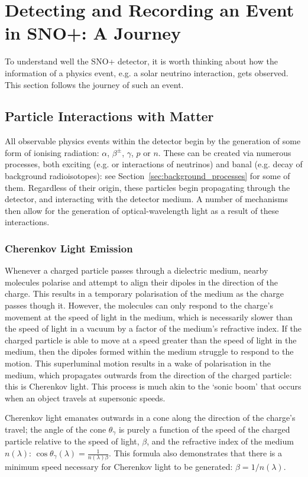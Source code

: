 \section{Detecting and Recording an Event in SNO+: A Journey}
To understand well the SNO+ detector, it is worth thinking about how the information of a physics event, e.g. a solar neutrino interaction, gets observed. This section follows the journey of such an event.
\subsection{Particle Interactions with Matter}\label{sec:interactions_w_matter}
All observable physics events within the detector begin by the generation of some form of ionising radiation: $\alpha$, $\beta^{\pm}$, $\gamma$, $p$ or $n$. These can be created via numerous processes, both exciting (e.g. \onbb{} or interactions of neutrinos) and banal (e.g. decay of background radioisotopes): see Section~\ref{sec:background_processes} for some of them. Regardless of their origin, these particles begin propagating through the detector, and interacting with the detector medium. A number of mechanisms then allow for the generation of optical-wavelength light as a result of these interactions.
\subsubsection{Cherenkov Light Emission}
Whenever a charged particle passes through a dielectric medium, nearby molecules polarise and attempt to align their dipoles in the direction of the charge. This results in a temporary polarisation of the medium as the charge passes though it. However, the molecules can only respond to the charge's movement at the speed of light in the medium, which is necessarily slower than the speed of light in a vacuum by a factor of the medium's refractive index. If the charged particle is able to move at a speed greater than the speed of light in the medium, then the dipoles formed within the medium struggle to respond to the motion. This superluminal motion results in a wake of polarisation in the medium, which propagates outwards from the direction of the charged particle: this is Cherenkov light. This process is much akin to the `sonic boom' that occurs when an object travels at supersonic speeds.

Cherenkov light emanates outwards in a cone along the direction of the charge's travel; the angle of the cone $\theta_{\gamma}$ is purely a function of the speed of the charged particle relative to the speed of light, $\beta$, and the refractive index of the medium $n(\lambda)$: $\cos{\theta_{\gamma}}(\lambda) = \frac{1}{n(\lambda)\beta}$. This formula also demonstrates that there is a minimum speed necessary for Cherenkov light to be generated: $\beta = 1/n(\lambda)$.

